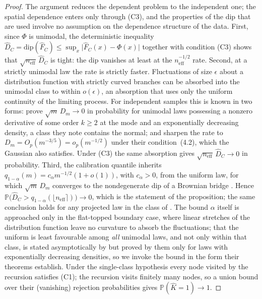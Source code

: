 \documentclass[11pt]{article}
\newcommand{\Prob}{\mathbb{P}}
\newcommand{\neff}{n_{\mathrm{eff}}}
\newcommand{\dip}{\mathrm{dip}}
\begin{document}
\begin{proof}
The argument reduces the dependent problem to the independent one; the
spatial dependence enters only through \textnormal{(C3)}, and the properties
of the dip that are used involve no assumption on the dependence structure of
the data. First, since $\Phi$ is unimodal, the deterministic inequality
$\hat D_C=\dip(\hat F_C)\le\sup_x\lvert\hat F_C(x)-\Phi(x)\rvert$
\citep{HartiganHartigan1985} together with condition (C3) shows that
$\sqrt{\neff}\,\hat D_C$ is tight: the dip vanishes at least at the
$\neff^{-1/2}$ rate. Second, at a strictly unimodal law the rate is strictly
faster. Fluctuations of size $\epsilon$ about a distribution function with
strictly curved branches can be absorbed into the unimodal class to within
$o(\epsilon)$, an absorption that uses only the uniform continuity of the
limiting process. For independent samples this is known in two forms:
\citet[Theorem~5]{HartiganHartigan1985} prove $\sqrt m\,D_m\to0$ in
probability for unimodal laws possessing a nonzero derivative of some order
$k\ge2$ at the mode and an exponentially decreasing density, a class they note
contains the normal; and \citet[Theorem~2]{ChengHall1998} sharpen the rate to
$D_m=O_p(m^{-3/5})=o_p(m^{-1/2})$ under their condition~(4.2), which the
Gaussian also satisfies. Under (C3) the same absorption gives
$\sqrt{\neff}\,\hat D_C\to0$ in probability. Third, the calibration
quantile inherits $q_{1-\alpha}(m)=c_\alpha m^{-1/2}(1+o(1))$, with
$c_\alpha>0$, from the uniform law, for which $\sqrt m\,D_m$ converges to the
nondegenerate dip of a Brownian bridge
\citep[Theorem~3]{HartiganHartigan1985}. Hence
$\Prob\bigl(\hat D_C>q_{1-\alpha}(\lfloor\neff\rceil)\bigr)\to0$, which
is the statement of the proposition;
the same conclusion holds for any projected law in the class of
\citet[Theorem~5]{HartiganHartigan1985}. The bound $\alpha$ itself is
approached only in the flat-topped boundary case, where linear stretches of the
distribution function leave no curvature to absorb the fluctuations; that the
uniform is least favourable among \emph{all} unimodal laws, and not only
within that class, is stated asymptotically by
\citet{HartiganHartigan1985} but proved by them only for laws with
exponentially decreasing densities, so we invoke the bound in the form their
theorems establish. Under the single-class
hypothesis every node visited by the recursion satisfies \textnormal{(C1)};
the recursion visits finitely many nodes, so a union bound over their
(vanishing) rejection probabilities gives $\Prob(\hat K=1)\to1$.
\end{proof}
\end{document}
